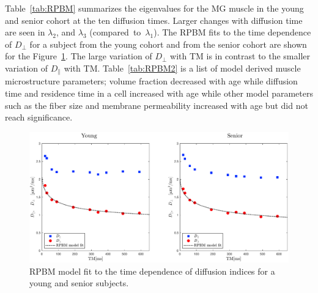 Table~\ref{tab:RPBM} summarizes the eigenvalues for the MG muscle in the young and senior cohort at the ten diffusion times. 
Larger changes with diffusion time are seen in $\lambda_2$, and $\lambda_3$ (compared~to~$\lambda_1$). 
The RPBM fits to the time dependence of $D_\perp$ for a subject from the young cohort and from the senior cohort are shown for the Figure~\ref{fig:RPBM fit}. The large variation of $D_\perp$ with TM is in contrast to the smaller variation of $D_\parallel$ with TM.
Table~\ref{tab:RPBM2} is a list of model derived muscle microstructure parameters; volume fraction decreased with age while diffusion time and residence time in a cell increased with age while other model parameters such as the fiber size and membrane permeability increased with age but did not reach significance.
\begin{figure}[!htb]
\vspace{+0.2cm}
\centering
\includegraphics[width=\textwidth]{Figures/RPBM_fit.pdf}
\caption[RPBM model fit to the time dependence of diffusion indices for a young and senior subjects]{RPBM model fit to the time dependence of diffusion indices for a young and senior subjects.}
\label{fig:RPBM fit}
\end{figure}
